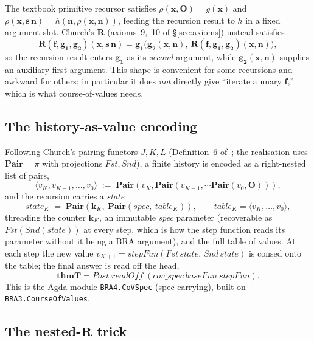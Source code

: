 \documentclass[11pt]{article}
\theoremstyle{plain}
\theoremstyle{definition}
\theoremstyle{remark}
\newcommand{\thmT}{\mathbf{thmT}}
\newcommand{\seq}[1]{\langle #1 \rangle}
\begin{document}
The textbook primitive recursor satisfies $\rho(\mathbf{x},\mathbf{O}) =
g(\mathbf{x})$ and $\rho(\mathbf{x},\mathbf{s}\,\mathbf{n}) =
h(\mathbf{n}, \rho(\mathbf{x},\mathbf{n}))$, feeding the recursion result
to $h$ in a fixed argument slot.  Church's $\mathbf{R}$ (axioms~9,~10 of
{\S}\ref{sec:axioms}) instead satisfies
\[
\mathbf{R}(\mathbf{f},\mathbf{g_1},\mathbf{g_2})(\mathbf{x},\mathbf{s}\,\mathbf{n}) = \mathbf{g_1}\bigl(\mathbf{g_2}(\mathbf{x},\mathbf{n}),\ \mathbf{R}(\mathbf{f},\mathbf{g_1},\mathbf{g_2})(\mathbf{x},\mathbf{n})\bigr),
\]
so the recursion result enters $\mathbf{g_1}$ as its \emph{second}
argument, while $\mathbf{g_2}(\mathbf{x},\mathbf{n})$ supplies an
auxiliary first argument.  This shape is convenient for some recursions
and awkward for others; in particular it does \emph{not} directly give
``iterate a unary $\mathbf{f}$,'' which is what course-of-values needs.

\subsection{The history-as-value encoding}

Following Church's pairing functors $J,K,L$ (Definition~6
of~\cite{Guard1963}; the realisation uses $\mathbf{Pair} = \pi$ with
projections $\mathit{Fst},\mathit{Snd}$), a finite history is encoded as a
right-nested list of pairs,
\[
\seq{v_K, v_{K-1}, \ldots, v_0} \;:=\; \mathbf{Pair}(v_K, \mathbf{Pair}(v_{K-1}, \cdots \mathbf{Pair}(v_0, \mathbf{O}))),
\]
and the recursion carries a \emph{state}
\[
\mathit{state}_K \;=\; \mathbf{Pair}(\mathbf{k}_K,\ \mathbf{Pair}(\mathit{spec},\ \mathit{table}_K)),
\qquad \mathit{table}_K = \seq{v_K, \ldots, v_0},
\]
threading the counter $\mathbf{k}_K$, an immutable \emph{spec} parameter
(recoverable as $\mathit{Fst}(\mathit{Snd}(\mathit{state}))$ at every
step, which is how the step function reads its parameter without it being
a BRA argument), and the full table of values.  At each step the new
value $v_{K+1} = \mathit{stepFun}(\mathit{Fst}\,\mathit{state},\,
\mathit{Snd}\,\mathit{state})$ is consed onto the table; the final answer
is read off the head,
\[
\thmT = \mathit{Post}\;\mathit{readOff}\;(\mathit{cov\_spec}\ \mathit{baseFun}\ \mathit{stepFun}).
\]
This is the Agda module \verb|BRA4.CoVSpec| (spec-carrying), built on
\verb|BRA3.CourseOfValues|.

\subsection{The nested-\texorpdfstring{$\mathbf{R}$}{R} trick}
\end{document}
